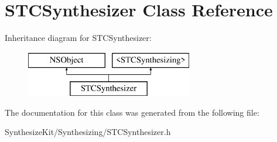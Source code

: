 \hypertarget{interface_s_t_c_synthesizer}{}\section{S\+T\+C\+Synthesizer Class Reference}
\label{interface_s_t_c_synthesizer}
Inheritance diagram for S\+T\+C\+Synthesizer\+:\begin{figure}[H]
\begin{center}
\leavevmode
\includegraphics[height=2.000000cm]{interface_s_t_c_synthesizer}
\end{center}
\end{figure}


The documentation for this class was generated from the following file\+:\begin{DoxyCompactItemize}
\item 
Synthesize\+Kit/\+Synthesizing/S\+T\+C\+Synthesizer.\+h\end{DoxyCompactItemize}
